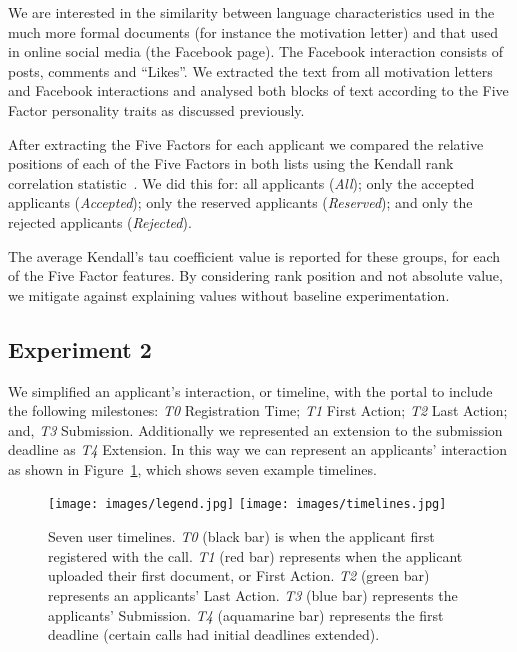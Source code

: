 \documentclass[letterpaper]{article}
\begin{document}
We are interested in the similarity between language characteristics
used in the much more formal documents (for instance the motivation
letter) and that used in online social media (the Facebook page). The
Facebook interaction consists of posts, comments and ``Likes''. We
extracted the text from all motivation letters and Facebook
interactions and analysed both blocks of text according to the Five
Factor personality traits as discussed previously.
 
After extracting the Five Factors for each applicant we compared the
relative positions of each of the Five Factors in both lists using the
Kendall rank correlation statistic~\cite{kendall:1938}. We did
this for: all applicants ({\emph{All}}); only the accepted applicants
({\emph{Accepted}}); only the reserved applicants ({\emph{Reserved}});
and only the rejected applicants ({\emph{Rejected}}).

The average Kendall's tau coefficient value is reported for these
groups, for each of the Five Factor features. By considering rank
position and not absolute value, we mitigate against explaining values
without baseline experimentation.

\subsection{Experiment 2}

We simplified an applicant's interaction, or timeline, with the portal
to include the following milestones: {\emph{T0}} Registration Time;
{\emph{T1}} First Action; {\emph{T2}} Last Action; and, {\emph{T3}}
Submission. Additionally we represented an extension to the submission
deadline as {\emph{T4}} Extension. In this way we can represent an
applicants’ interaction as shown in Figure~\ref{fig:timelines}, which
shows seven example timelines.

\begin{figure}[!ht]
\centering
\texttt{[image: images/legend.jpg]}
\texttt{[image: images/timelines.jpg]}
\caption{Seven user timelines. {\emph{T0}} (black bar) is when the applicant first
registered with the call. {\emph{T1}} (red bar) represents when the applicant
uploaded their first document, or First Action. {\emph{T2}} (green bar)
represents an applicants' Last Action. {\emph{T3}} (blue bar) represents the
applicants' Submission. {\emph{T4}} (aquamarine bar) represents the first
deadline (certain calls had initial deadlines extended).}
\label{fig:timelines}
\end{figure}
\end{document}
